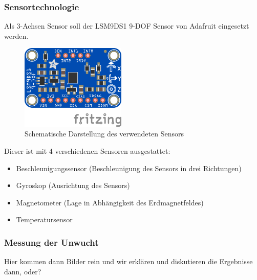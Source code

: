 \subsubsection*{Sensortechnologie}
Als 3-Achsen Sensor soll der LSM9DS1 9-DOF Sensor von Adafruit eingesetzt werden.
\begin{figure}[H]
	\centering
	\includegraphics[width=5cm]{images/chapter/03/9-dof.png}
	\caption{Schematische Darstellung des verwendeten Sensors}
\end{figure}
Dieser ist mit 4 verschiedenen Sensoren ausgestattet:
\begin{itemize}
	\item Beschleunigungssensor (Beschleunigung des Sensors in drei Richtungen)
	\item Gyroskop (Ausrichtung des Sensors)
	\item Magnetometer (Lage in Abhängigkeit des Erdmagnetfeldes)
	\item Temperatursensor
\end{itemize}

\subsubsection*{Messung der Unwucht}
Hier kommen dann Bilder rein und wir erklären und diskutieren die Ergebnisse dann, oder?

